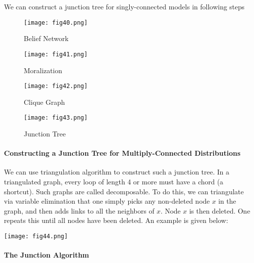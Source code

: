 We can construct a junction tree for singly-connected models in following steps
\begin{figure*}[h]
	\centering
	\begin{subfigure}[b]{0.24\textwidth}
		\centering
		\texttt{[image: fig40.png]}
		\caption*{Belief Network}
	\end{subfigure}
	\begin{subfigure}[b]{0.24\textwidth}
		\centering
		\texttt{[image: fig41.png]}
		\caption*{Moralization}
	\end{subfigure}
	\begin{subfigure}[b]{0.24\textwidth}
		\centering
		\texttt{[image: fig42.png]}
		\caption*{Clique Graph}
	\end{subfigure}
	\begin{subfigure}[b]{0.24\textwidth}
		\centering
		\texttt{[image: fig43.png]}
		\caption*{Junction Tree}
	\end{subfigure}
\end{figure*}

\paragraph{Constructing a Junction Tree for Multiply-Connected Distributions}

We can use triangulation algorithm to construct such a junction tree. In a triangulated graph, every loop of length 4 or more must have a chord (a shortcut). Such graphs are called decomposable. To do this, we can triangulate via variable elimination that one simply picks any non-deleted node $x$ in the graph, and then adds links to all the neighbors of $x$. Node $x$ is then deleted. One repeats this until all nodes have been deleted. An example is given below:
\begin{figure*}[h]
	\centering
	\texttt{[image: fig44.png]}
\end{figure*}

\paragraph{The Junction Algorithm}

